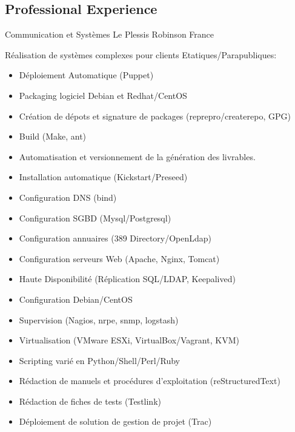 \documentclass[10pt,a4paper]{moderncv}
\begin{document}
\subsection{Professional Experience}

              {Communication et Systèmes}
              {Le Plessis Robinson}
              {France}
              {Réalisation de systèmes complexes pour clients Etatiques/Parapubliques:
                \begin{itemize}
                \item Déploiement Automatique (Puppet)
                \item Packaging logiciel Debian et Redhat/CentOS
                \item Création de dépots et signature de packages (reprepro/createrepo, GPG)
                \item Build (Make, ant)
                \item Automatisation et versionnement de la génération des livrables.
                \item Installation automatique (Kickstart/Preseed)
                \item Configuration DNS (bind)
                \item Configuration SGBD (Mysql/Postgresql)
                \item Configuration annuaires (389 Directory/OpenLdap)
                \item Configuration serveurs Web (Apache, Nginx, Tomcat)
                \item Haute Disponibilité (Réplication SQL/LDAP, Keepalived)
                \item Configuration Debian/CentOS
                \item Supervision (Nagios, nrpe, snmp, logstash)
                \item Virtualisation (VMware ESXi, VirtualBox/Vagrant, KVM)
                \item Scripting varié en Python/Shell/Perl/Ruby
                \item Rédaction de manuels et procédures d'exploitation (reStructuredText)
                \item Rédaction de fiches de tests (Testlink)
                \item Déploiement de solution de gestion de projet (Trac)
                \end{itemize}
              }
\end{document}
